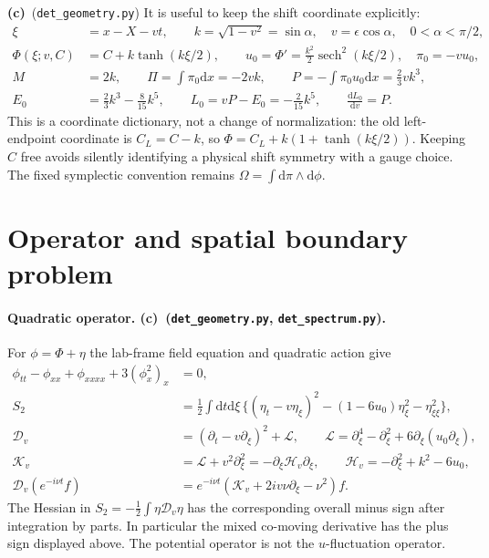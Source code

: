 \documentclass[11pt,a4paper]{article}
\newcommand{\Lc}{\textbf{(c)}}
\newcommand{\G}{\texttt{det\_geometry.py}}
\newcommand{\Scheck}{\texttt{det\_spectrum.py}}
\newcommand{\dd}{\mathrm d}
\begin{document}
\Lc\ (\G) It is useful to keep the shift coordinate explicitly:
\begin{align}
 \xi&=x-X-vt,\qquad k=\sqrt{1-v^2}=\sin\alpha,\quad v=\epsilon\cos\alpha,
 \quad 0<\alpha<\pi/2,\\
 \Phi(\xi;v,C)&=C+k\tanh(k\xi/2),\qquad
 u_0=\Phi'=\frac{k^2}{2}\operatorname{sech}^2(k\xi/2),\quad \pi_0=-vu_0,
 \label{eq:profile}\\
 M&=2k,\qquad \Pi=\int\pi_0\dd x=-2vk,\qquad
 P=-\int\pi_0u_0\dd x=\frac23vk^3,\\
 E_0&=\frac23k^3-\frac8{15}k^5,\qquad
 L_0=vP-E_0=-\frac2{15}k^5,\qquad \frac{\dd L_0}{\dd v}=P.
\end{align}
This is a coordinate dictionary, not a change of normalization: the old
left-endpoint coordinate is $C_L=C-k$, so $\Phi=C_L+k(1+\tanh(k\xi/2))$.
Keeping $C$ free avoids silently identifying a physical shift symmetry with
a gauge choice. The fixed symplectic convention remains
$\Omega=\int\dd\pi\wedge\dd\phi$.

\section{Operator and spatial boundary problem}
\paragraph{Quadratic operator. \Lc\ (\G, \Scheck).}
For $\phi=\Phi+\eta$ the lab-frame field equation and quadratic action give
\begin{align}
 \phi_{tt}-\phi_{xx}+\phi_{xxxx}+3(\phi_x^2)_x&=0,\\
 S_2&=\frac12\int\dd t\dd\xi\,
 \{(\eta_t-v\eta_\xi)^2-(1-6u_0)\eta_\xi^2-\eta_{\xi\xi}^2\},\\
 \mathcal D_v&=(\partial_t-v\partial_\xi)^2+\mathcal L,
 \qquad \mathcal L=\partial_\xi^4-\partial_\xi^2
                  +6\partial_\xi(u_0\partial_\xi),\\
 \mathcal K_v&=\mathcal L+v^2\partial_\xi^2
        =-\partial_\xi\mathcal H_v\partial_\xi,
 \qquad \mathcal H_v=-\partial_\xi^2+k^2-6u_0,\label{eq:K}\\
 \mathcal D_v(e^{-i\nu t}f)&=e^{-i\nu t}
       (\mathcal K_v+2iv\nu\partial_\xi-\nu^2)f.
\end{align}
The Hessian in $S_2=-\frac12\int\eta\mathcal D_v\eta$ has the corresponding
overall minus sign after integration by parts. In particular the mixed
co-moving derivative has the plus sign displayed above.
The potential operator is not the $u$-fluctuation operator.
\end{document}
